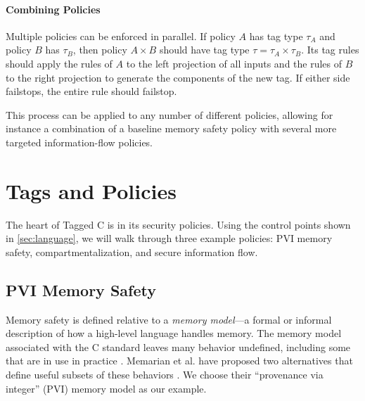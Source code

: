 \documentclass{llncs}
\begin{document}
\paragraph*{Combining Policies}

Multiple policies can be enforced in parallel. If policy \(A\) has tag type \(\tau_A\)
and policy \(B\) has \(\tau_B\), then policy \(A \times B\) should have tag type
\(\tau = \tau_A \times \tau_B\). Its tag rules should apply the rules of \(A\) to
the left projection of all inputs and the rules of \(B\) to the right projection
to generate the components of the new tag. If either side failstops, the entire
rule should failstop.

This process can be applied to any number of different policies, allowing for instance
a combination of a baseline memory safety policy with several more targeted
information-flow policies.

\section{Tags and Policies}
\label{sec:policies}

The heart of Tagged C is in its security policies. Using the control points shown in \cref{sec:language},
we will walk through three example policies: PVI memory safety, compartmentalization, and
secure information flow.

\subsection{PVI Memory Safety}
\label{sec:PVI}

Memory safety is defined relative to a {\em memory model}---a formal or informal description of
how a high-level language handles memory. The memory model associated with the C standard leaves
many behavior undefined, including some that are in use in practice \cite{Memarian16:DeFacto}.
Memarian et al. have proposed two alternatives that define useful subsets of these behaviors
\cite{Memarian19:ExploringCSemantics}. We choose their ``provenance via integer'' (PVI) memory model
as our example. 
\end{document}
